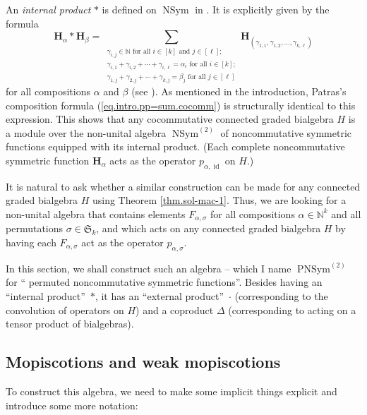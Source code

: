\documentclass[numbers=enddot,12pt,final,onecolumn,notitlepage]{scrartcl}%
\theoremstyle{definition}
\let\sumnonlimits\sum
\renewcommand{\sum}{\sumnonlimits\limits}
\begin{document}
An \emph{internal product} $\ast$ is defined on $\operatorname*{NSym}$ in
\cite[\S 5.1]{ncsf1}. It is explicitly given by the formula%
\[
\mathbf{H}_{\alpha}\ast\mathbf{H}_{\beta}=\sum_{\substack{\gamma_{i,j}%
\in\mathbb{N}\text{ for all }i\in\left[  k\right]  \text{ and }j\in\left[
\ell\right]  ;\\\gamma_{i,1}+\gamma_{i,2}+\cdots+\gamma_{i,\ell}=\alpha
_{i}\text{ for all }i\in\left[  k\right]  ;\\\gamma_{1,j}+\gamma_{2,j}%
+\cdots+\gamma_{k,j}=\beta_{j}\text{ for all }j\in\left[  \ell\right]
}}\mathbf{H}_{\left(  \gamma_{1,1},\gamma_{1,2},\ldots,\gamma_{k,\ell}\right)
}%
\]
for all compositions $\alpha$ and $\beta$ (see \cite[Proposition 5.1]{ncsf1}).
As mentioned in the introduction, Patras's composition formula
(\ref{eq.intro.pp=sum.cocomm}) is structurally identical to this expression.
This shows that any cocommutative connected graded bialgebra $H$ is a module
over the non-unital algebra $\operatorname*{NSym}\nolimits^{\left(  2\right)
}$ of noncommutative symmetric functions equipped with its internal product.
(Each complete noncommutative symmetric function $\mathbf{H}_{\alpha}$ acts as
the operator $p_{\alpha,\operatorname*{id}}$ on $H$.)

It is natural to ask whether a similar construction can be made for any
connected graded bialgebra $H$ using Theorem \ref{thm.sol-mac-1}. Thus, we are
looking for a non-unital algebra that contains elements $F_{\alpha,\sigma}$
for all compositions $\alpha\in\mathbb{N}^{k}$ and all permutations $\sigma
\in\mathfrak{S}_{k}$, and which acts on any connected graded bialgebra $H$ by
having each $F_{\alpha,\sigma}$ act as the operator $p_{\alpha,\sigma}$.

In this section, we shall construct such an algebra -- which I name
$\operatorname*{PNSym}\nolimits^{\left(  2\right)  }$ for \textquotedblleft
permuted noncommutative symmetric functions\textquotedblright. Besides having
an \textquotedblleft internal product\textquotedblright\ $\ast$, it has an
\textquotedblleft external product\textquotedblright\ $\cdot$ (corresponding
to the convolution of operators on $H$) and a coproduct $\Delta$
(corresponding to acting on a tensor product of bialgebras).

\subsection{Mopiscotions and weak mopiscotions}

To construct this algebra, we need to make some implicit things explicit and
introduce some more notation:
\end{document}

